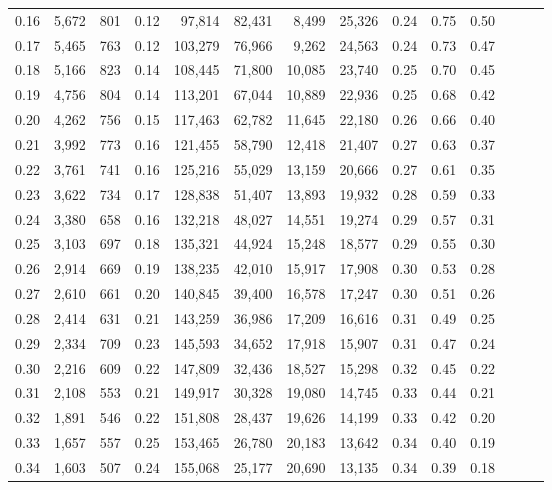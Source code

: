 \begin{tabular}{rrrrrrrrrrrrrr}
0.16 &  5,672 &  801 &  0.12 &   97,814 &   82,431 &   8,499 &  25,326 &  0.24 &  0.75 &      0.50 \\
0.17 &  5,465 &  763 &  0.12 &  103,279 &   76,966 &   9,262 &  24,563 &  0.24 &  0.73 &      0.47 \\
0.18 &  5,166 &  823 &  0.14 &  108,445 &   71,800 &  10,085 &  23,740 &  0.25 &  0.70 &      0.45 \\
0.19 &  4,756 &  804 &  0.14 &  113,201 &   67,044 &  10,889 &  22,936 &  0.25 &  0.68 &      0.42 \\
0.20 &  4,262 &  756 &  0.15 &  117,463 &   62,782 &  11,645 &  22,180 &  0.26 &  0.66 &      0.40 \\
0.21 &  3,992 &  773 &  0.16 &  121,455 &   58,790 &  12,418 &  21,407 &  0.27 &  0.63 &      0.37 \\
0.22 &  3,761 &  741 &  0.16 &  125,216 &   55,029 &  13,159 &  20,666 &  0.27 &  0.61 &      0.35 \\
0.23 &  3,622 &  734 &  0.17 &  128,838 &   51,407 &  13,893 &  19,932 &  0.28 &  0.59 &      0.33 \\
0.24 &  3,380 &  658 &  0.16 &  132,218 &   48,027 &  14,551 &  19,274 &  0.29 &  0.57 &      0.31 \\
0.25 &  3,103 &  697 &  0.18 &  135,321 &   44,924 &  15,248 &  18,577 &  0.29 &  0.55 &      0.30 \\
0.26 &  2,914 &  669 &  0.19 &  138,235 &   42,010 &  15,917 &  17,908 &  0.30 &  0.53 &      0.28 \\
0.27 &  2,610 &  661 &  0.20 &  140,845 &   39,400 &  16,578 &  17,247 &  0.30 &  0.51 &      0.26 \\
0.28 &  2,414 &  631 &  0.21 &  143,259 &   36,986 &  17,209 &  16,616 &  0.31 &  0.49 &      0.25 \\
0.29 &  2,334 &  709 &  0.23 &  145,593 &   34,652 &  17,918 &  15,907 &  0.31 &  0.47 &      0.24 \\
0.30 &  2,216 &  609 &  0.22 &  147,809 &   32,436 &  18,527 &  15,298 &  0.32 &  0.45 &      0.22 \\
0.31 &  2,108 &  553 &  0.21 &  149,917 &   30,328 &  19,080 &  14,745 &  0.33 &  0.44 &      0.21 \\
0.32 &  1,891 &  546 &  0.22 &  151,808 &   28,437 &  19,626 &  14,199 &  0.33 &  0.42 &      0.20 \\
0.33 &  1,657 &  557 &  0.25 &  153,465 &   26,780 &  20,183 &  13,642 &  0.34 &  0.40 &      0.19 \\
0.34 &  1,603 &  507 &  0.24 &  155,068 &   25,177 &  20,690 &  13,135 &  0.34 &  0.39 &      0.18 \\

\end{tabular}
